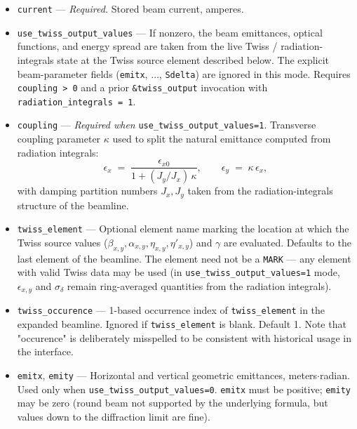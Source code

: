 \documentclass[11pt]{article}
\begin{document}
\begin{itemize}
\item \verb|current| --- {\em Required.}  Stored beam current, amperes.

\item \verb|use_twiss_output_values| --- If nonzero, the beam
        emittances, optical functions, and energy spread are taken from
        the live Twiss / radiation-integrals state at the Twiss source
        element described below.  The explicit beam-parameter fields
        (\verb|emitx|, $\dots$, \verb|Sdelta|) are ignored in this mode.
        Requires \verb|coupling > 0| and a prior \verb|&twiss_output|
        invocation with \verb|radiation_integrals = 1|.

\item \verb|coupling| --- {\em Required when} \verb|use_twiss_output_values=1|.
        Transverse coupling parameter $\kappa$ used to split the natural
        emittance computed from radiation integrals:
\begin{equation}
\epsilon_x \;=\; \frac{\epsilon_{x0}}{1 + (J_y/J_x)\,\kappa},
\qquad
\epsilon_y \;=\; \kappa\,\epsilon_x,
\end{equation}
        with damping partition numbers $J_x, J_y$ taken from the
        radiation-integrals structure of the beamline.

\item \verb|twiss_element| --- Optional element name marking the
        location at which the Twiss source values
        ($\beta_{x,y}, \alpha_{x,y}, \eta_{x,y}, \eta'_{x,y}$) and
        $\gamma$ are evaluated.  Defaults to the last element of the
        beamline.  The element need not be a \verb|MARK| --- any
        element with valid Twiss data may be used (in
        \verb|use_twiss_output_values=1| mode, $\epsilon_{x,y}$ and
        $\sigma_\delta$ remain ring-averaged quantities from the
        radiation integrals).

\item \verb|twiss_occurence| --- 1-based occurrence index of
        \verb|twiss_element| in the expanded beamline.  Ignored if
        \verb|twiss_element| is blank.  Default 1. Note that "occurence"
        is deliberately misspelled to be consistent with historical
        usage in the interface.

\item \verb|emitx|, \verb|emity| --- Horizontal and vertical
        geometric emittances, meters$\cdot$radian.  Used only when
        \verb|use_twiss_output_values=0|.  \verb|emitx| must be
        positive; \verb|emity| may be zero (round beam not supported by
        the underlying formula, but values down to the diffraction
        limit are fine).


\end{itemize}
\end{document}
